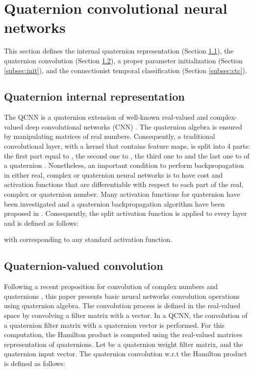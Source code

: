 \documentclass[a4paper]{article}
\begin{document}
\section{Quaternion convolutional neural networks}
\label{sec:QCNN}

This section defines the internal quaternion representation (Section \ref{subsec:qinternal}), the quaternion convolution (Section \ref{subsec:qconv}), a proper parameter initialization (Section \ref{subsec:init}), and the connectionist temporal classification (Section \ref{subsec:ctc}).

\subsection{Quaternion internal representation}
\label{subsec:qinternal}
The QCNN is a quaternion extension of well-known real-valued and complex-valued deep convolutional networks (CNN) \cite{he2016deep,chiheb2017complex}. The quaternion algebra is ensured by manipulating matrices of real numbers. Consequently, a traditional  convolutional layer, with a kernel that contains  feature maps, is split into 4 parts: the first part equal to , the second one to , the third one to  and the last one to  of a quaternion . Nonetheless, an important condition to perform backpropagation in either real, complex or quaternion neural networks is to have cost and activation functions that are differentiable with respect to each part of the real, complex or quaternion number. Many activation functions for quaternion have been investigated \cite{xu2017learning} and a quaternion backpropagation algorithm have been proposed in \cite{nitta1995quaternary}. Consequently, the split activation \cite{arena1994neural,parcollet2016quaternion} function is applied to every layer and is defined as follows:

with  corresponding to any standard activation function.

\subsection{Quaternion-valued convolution}
\label{subsec:qconv}
Following a recent proposition for convolution of complex numbers\cite{chiheb2017complex} and quaternions \cite{chase2017quat}, this paper presents basic neural networks convolution operations using quaternion algebra. The convolution process is defined in the real-valued space by convolving a filter matrix with a vector. In a QCNN, the convolution of a quaternion filter matrix with a quaternion vector is performed. For this computation, the Hamilton product is computed using the real-valued matrices representation of quaternions. Let  be a quaternion weight filter matrix, and  the quaternion input vector. The quaternion convolution w.r.t the Hamilton product  is defined as follows:
\end{document}
